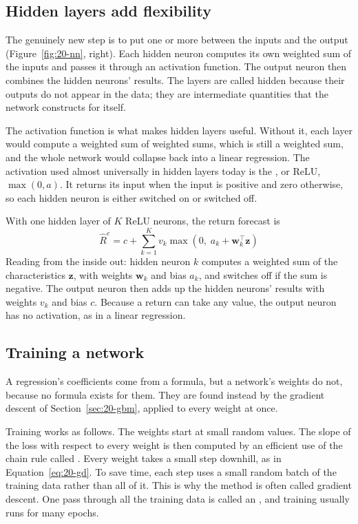 \subsection{Hidden layers add flexibility}

The genuinely new step is to put one or more  between the inputs and the output (Figure~\ref{fig:20-nn}, right). Each hidden neuron computes its own weighted sum of the inputs and passes it through an activation function. The output neuron then combines the hidden neurons' results. The layers are called hidden because their outputs do not appear in the data; they are intermediate quantities that the network constructs for itself.

The activation function is what makes hidden layers useful. Without it, each layer would compute a weighted sum of weighted sums, which is still a weighted sum, and the whole network would collapse back into a linear regression. The activation used almost universally in hidden layers today is the , or ReLU, $\max(0, a)$. It returns its input when the input is positive and zero otherwise, so each hidden neuron is either switched on or switched off.

With one hidden layer of $K$ ReLU neurons, the return forecast is
\begin{equation}
  \hat{R}^{e} = c + \sum_{k=1}^{K} v_k \max\!\left(0,\; a_k + \mathbf{w}_k^{\top}\mathbf{z}\right)
  \label{eq:20-nn}
\end{equation}
Reading from the inside out: hidden neuron $k$ computes a weighted sum of the characteristics $\mathbf{z}$, with weights $\mathbf{w}_k$ and bias $a_k$, and switches off if the sum is negative. The output neuron then adds up the hidden neurons' results with weights $v_k$ and bias $c$. Because a return can take any value, the output neuron has no activation, as in a linear regression.

\subsection{Training a network}

A regression's coefficients come from a formula, but a network's weights do not, because no formula exists for them. They are found instead by the gradient descent of Section~\ref{sec:20-gbm}, applied to every weight at once.

Training works as follows. The weights start at small random values. The slope of the loss with respect to every weight is then computed by an efficient use of the chain rule called . Every weight takes a small step downhill, as in Equation~\eqref{eq:20-gd}. To save time, each step uses a small random batch of the training data rather than all of it. This is why the method is often called  gradient descent. One pass through all the training data is called an , and training usually runs for many epochs.

